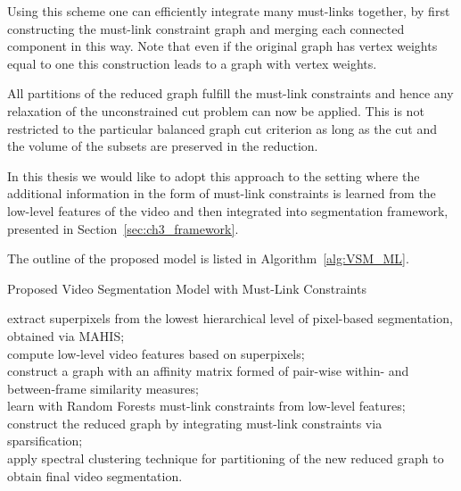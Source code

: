 Using this scheme one can efficiently integrate many must-links together, by first constructing the must-link constraint graph and merging each connected component in this way. Note that even if the original graph
has vertex weights equal to one this construction leads to a graph with vertex weights.

All partitions of the reduced graph fulfill the must-link constraints and hence any relaxation of the unconstrained cut problem can now be applied. This is not restricted to the particular balanced graph cut criterion as long as
the cut and the volume of the subsets are preserved in the reduction. 

In this thesis we would like to adopt this approach to the setting where the additional information in the form of must-link constraints is learned from 
the low-level features of the video and then integrated into segmentation framework, presented in Section~\ref{sec:ch3_framework}.

The outline of the proposed model is listed in Algorithm~\ref{alg:VSM_ML}. 
\incmargin{1em} 
\begin{algorithm}[htbp]
\caption{Proposed Video Segmentation Model with Must-Link Constraints}
\label{alg:VSM_ML}
\DontPrintSemicolon
\BlankLine
\Indm  
{}
\Indp
\BlankLine
extract superpixels from the lowest hierarchical level of pixel-based segmentation, obtained via MAHIS;\\
compute low-level video features based on superpixels;\\ 
construct a graph with an affinity matrix formed of pair-wise within- and between-frame similarity measures;\\
learn with Random Forests must-link constraints from low-level features;\\
construct the reduced graph by integrating must-link constraints via sparsification;\\
apply spectral clustering technique for partitioning of the new reduced graph to obtain final video segmentation.
\BlankLine
\Indm  
\end{algorithm}
\decmargin{1em}

